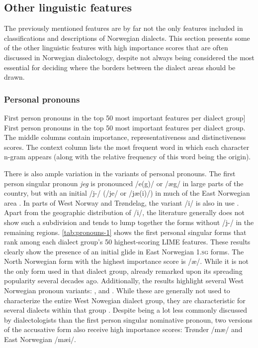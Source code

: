 \subsection{Other linguistic features}
\label{sec:dialects-results-lingother}

The previously mentioned features are by far not the only features included in classifications and descriptions of Norwegian dialects.
This section presents some of the other linguistic features with high importance scores that are often discussed in Norwegian dialectology, despite not always being considered the most essential for deciding where the borders between the dialect areas should be drawn.

\subsubsection{Personal pronouns}
\label{sec:dialects-results-pronouns}

\begin{table}[htbp]
    
    \caption
    [First person pronouns in the top 50 most important features per dialect group]
    {First person pronouns in the top 50 most important features per dialect group.
    The middle columns contain importance, representativeness and distinctiveness scores.
    The context column lists the most frequent word in which each character n-gram appears (along with the relative frequency of this word being the origin).}
    \label{tab:pronouns-1}
\end{table}

There is also ample variation in the variants of personal pronouns. 
The first person singular pronoun \textit{jeg} is pronounced /e(g)/ or /{\ae}g/ in large parts of the country, but with an initial /j-/ (/je/ or /j{\ae}(i)/) in much of the East Norwegian area
\cite[pp.~22--23]{jahr1990dialekter}.
In parts of West Norway and Trøndelag, the variant /i/ is also in use \cite[pp.~22--23]{jahr1990dialekter}.
Apart from the geographic distribution of /i/, the literature generally does not show such a subdivision and tends to lump together the forms without /j-/ in the remaining regions.
\autoref{tab:pronouns-1} shows the first personal singular forms that rank among each dialect group's 50 highest-scoring LIME features.
These results clearly show the presence of an initial glide in East Norwegian \textsc{1.sg} forms.
The North Norwegian form with the highest importance score is /\ae/. 
While it is not the only form used in that dialect group, \citet[p.~36]{jahr1996nordnorske} already remarked upon its spreading popularity several decades ago.
Additionally, the results highlight several West Norwegian pronoun variants: ,  and .
While these are generally not used to characterize the entire West Nowegian dialect group, they are characteristic for several dialects within that group \citet[pp.~71, 74, 76, 79]{sandoey1996vestlandet}.
Despite being a lot less commonly discussed by dialectologists than the first person singular nominative pronoun, two versions of the accusative form also receive high importance scores: Trønder /mæ/ and East Norwegian /mæi/.

